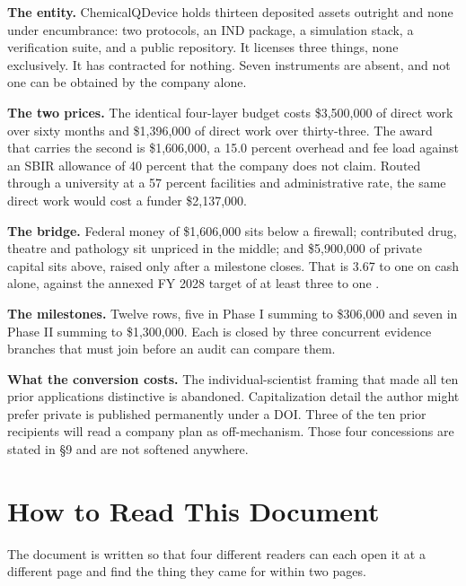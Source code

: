 \textbf{The entity.} ChemicalQDevice holds thirteen deposited assets outright
and none under encumbrance: two protocols, an IND package, a simulation stack, a
verification suite, and a public repository. It licenses three things, none
exclusively. It has contracted for nothing. Seven instruments are absent, and
not one can be obtained by the company alone.

\textbf{The two prices.} The identical four-layer budget costs \$3,500,000 of
direct work over sixty months and \$1,396,000 of direct work over thirty-three.
The award that carries the second is \$1,606,000, a 15.0 percent overhead and
fee load against an SBIR allowance of 40 percent that the company does not
claim. Routed through a university at a 57 percent facilities and administrative
rate, the same direct work would cost a funder \$2,137,000.

\textbf{The bridge.} Federal money of \$1,606,000 sits below a firewall;
contributed drug, theatre and pathology sit unpriced in the middle; and
\$5,900,000 of private capital sits above, raised only after a milestone closes.
That is 3.67 to one on cash alone, against the annexed FY 2028 target of at
least three to one \cite{kratsiosvought2026fy2028priorities}.

\textbf{The milestones.} Twelve rows, five in Phase I summing to \$306,000 and
seven in Phase II summing to \$1,300,000. Each is closed by three concurrent
evidence branches that must join before an audit can compare them.

\textbf{What the conversion costs.} The individual-scientist framing that made
all ten prior applications distinctive is abandoned. Capitalization detail the
author might prefer private is published permanently under a DOI. Three of the
ten prior recipients will read a company plan as off-mechanism. Those four
concessions are stated in \S9 and are not softened anywhere.

\section*{How to Read This Document}

The document is written so that four different readers can each open it at a
different page and find the thing they came for within two pages.

